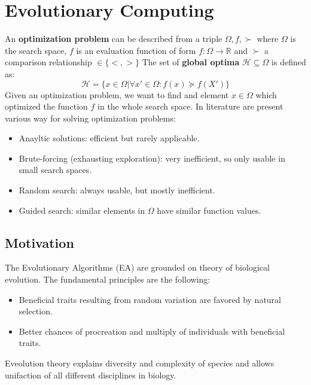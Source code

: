 \documentclass{article}
\begin{document}
\section{Evolutionary Computing}
An \textbf{optimization problem} can be described from a triple $\Omega,f,\succ$ where $\Omega$
is the search space, $f$ is an evaluation function of form $f:\Omega\rightarrow\mathbb{R}$ and
$\succ$ a comparison relationship $\in\{<,>\}$
The set of \textbf{global optima} $\mathcal{H}\subseteq\Omega$ is defined as:
$$\mathcal{H}=\{x\in\Omega|\forall x'\in\Omega : f(x)\succeq f(X')\}$$
Given an optimization problem, we want to find and element $x\in\Omega$ which optimized
the function $f$ in the whole search space. In literature are present various way
for solving optimization problems:
\begin{itemize}
    \item Anayltic solutions: efficient but rarely applicable.
    \item Brute-forcing (exhausting exploration): very inefficient, so only usable in small search spaces.
    \item Random search: always usable, but mostly inefficient.
    \item Guided search: similar elements in $\Omega$ have similar function values.
\end{itemize}

\subsection{Motivation}
The Evolutionary Algorithms (EA) are grounded on theory of biological evolution. The fundamental
principles are the following:
\begin{itemize}
    \item Beneficial traits resulting from random variation are favored by natural selection.
    \item Better chances of procreation and multiply of individuals with beneficial traits.
\end{itemize}
Eveolution theory explains diversity and complexity of species and allows unifaction of all different
disciplines in biology.
\end{document}
